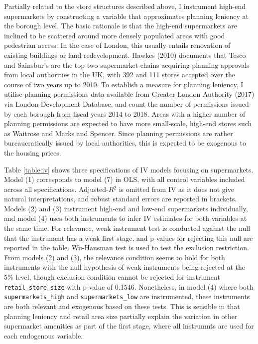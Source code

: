 \documentclass{article}
\begin{document}
Partially related to the store structures described above, I instrument high-end supermarkets by constructing a variable that approximates planning leniency at the borough level. The basic rationale is that the high-end supermarkets are inclined to be scattered around more densely populated areas with good pedestrian access. In the case of London, this usually entails renovation of existing buildings or land redevelopment. Hawkes (2010) documents that Tesco and Sainsbur's are the top two supermarket chains acquiring planning approvals from local authorities in the UK, with 392 and 111 stores accepted over the course of two years up to 2010. To establish a measure for planning leniency, I utilise planning permissions data available from Greater London Authority (2017) via London Development Database, and count the number of permissions issued by each borough from fiscal years 2014 to 2018. Areas with a higher number of planning permissions are expected to have more small-scale, high-end stores such as Waitrose and Marks and Spencer. Since planning permissions are rather bureaucratically issued by local authorities, this is expected to be exogenous to the housing prices.

Table \ref{table:iv} shows three specifications of IV models focusing on supermarkets. Model (1) corresponds to model (7) in OLS, with all control variables included across all specifications. Adjusted-$R{^2}$ is omitted from IV as it does not give natural interpretations, and robust standard errors are reported in brackets. Models (2) and (3) instrument high-end and low-end supermarkets individually, and model (4) uses both instruments to infer IV estimates for both variables at the same time. For relevance, weak instrument test is conducted against the null that the instrument has a weak first stage, and p-values for rejecting this null are reported in the table. Wu-Hausman test is used to test the exclusion restriction. From models (2) and (3), the relevance condition seems to hold for both instruments with the null hypothesis of weak instruments being rejected at the 5\% level, though exclusion condition cannot be rejected for instrument \texttt{retail\_store\_size} with p-value of 0.1546. Nonetheless, in model (4) where both \texttt{supermarkets\_high} and \texttt{supermarkets\_low} are instrumented, these instruments are both relevant and exogenous based on these tests. This is sensible in that planning leniency and retail area size partially explain the variation in other supermarket amenities as part of the first stage, where all instrumnts are used for each endogenous variable. 
\end{document}
